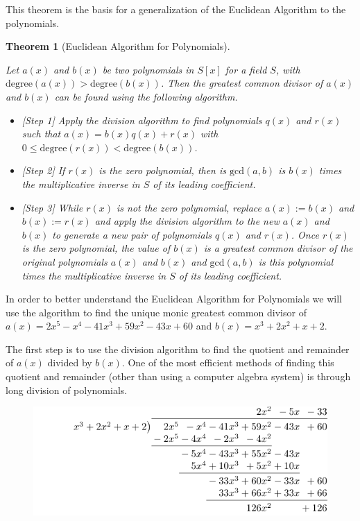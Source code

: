 \documentclass[
]{book}
\providecommand{\tightlist}{%
  \setlength{\itemsep}{0pt}\setlength{\parskip}{0pt}}
\newtheorem{theorem}{Theorem}[chapter]
\theoremstyle{definition}
\theoremstyle{definition}
\theoremstyle{definition}
\theoremstyle{definition}
\theoremstyle{remark}
\begin{document}
This theorem is the basis for a generalization of the Euclidean Algorithm to the polynomials.

\begin{theorem}[Euclidean Algorithm for Polynomials]
\protect\hypertarget{thm:unlabeled-div-126}{}\label{thm:unlabeled-div-126}

Let \(a(x)\) and \(b(x)\) be two polynomials in \(S[x]\) for a field \(S\), with \(\mathrm{degree}(a(x))>\mathrm{degree}(b(x))\). Then the greatest common divisor of \(a(x)\) and \(b(x)\) can be found using the following algorithm.

\begin{itemize}
\tightlist
\item
  {[}Step 1{]} Apply the division algorithm to find polynomials \(q(x)\) and \(r(x)\) such that \(a(x)=b(x)q(x)+r(x)\) with \(0\leq \mathrm{degree}(r(x))<\mathrm{degree}(b(x))\).
\item
  {[}Step 2{]} If \(r(x)\) is the zero polynomial, then is \(\mathrm{gcd}(a,b)\) is \(b(x)\) times the multiplicative inverse in \(S\) of its leading coefficient.
\item
  {[}Step 3{]} While \(r(x)\) is not the zero polynomial, replace \(a(x):=b(x)\) and \(b(x):=r(x)\) and apply the division algorithm to the new \(a(x)\) and \(b(x)\) to generate a new pair of polynomials \(q(x)\) and \(r(x)\). Once \(r(x)\) is the zero polynomial, the value of \(b(x)\) is a greatest common divisor of the original polynomials \(a(x)\) and \(b(x)\) and \(\mathrm{gcd}(a,b)\) is this polynomial times the multiplicative inverse in \(S\) of its leading coefficient.
\end{itemize}

\end{theorem}

In order to better understand the Euclidean Algorithm for Polynomials we will use the algorithm to find the unique monic greatest common divisor of \(a(x)=2x^5-x^4-41x^3+59x^2-43x+60\) and \(b(x)=x^3+2x^2+x+2\).

The first step is to use the division algorithm to find the quotient and remainder of \(a(x)\) divided by \(b(x)\). One of the most efficient methods of finding this quotient and remainder (other than using a computer algebra system) is through long division of polynomials.

\begin{figure}

{\centering \includegraphics[width=0.75\linewidth]{tikz/polynomial-division} 

}

\end{figure}
\end{document}
